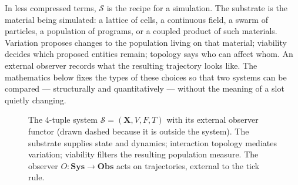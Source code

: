 \documentclass[journal]{IEEEtran}
\theoremstyle{plain}
\theoremstyle{definition}
\theoremstyle{plain}
\newcommand{\Mplus}{\mathcal{M}_{+}}
\newcommand{\X}{\mathbf{X}}
\begin{document}
In less compressed terms, $\mathcal{S}$ is the recipe for a simulation. The
substrate is the material being simulated: a lattice of cells, a continuous
field, a swarm of particles, a population of programs, or a coupled product of
such materials. Variation proposes changes to the population living on that
material; viability decides which proposed entities remain; topology says who
can affect whom. An external observer records what the resulting trajectory
looks like. The mathematics below fixes the types of these choices so that
two systems can be compared --- structurally and quantitatively --- without
the meaning of a slot quietly changing.

\begin{figure}[t]
\centering
{}
\caption{The 4-tuple system $\mathcal{S}=(\X,V,F,T)$ with its external
observer functor (drawn dashed because it is outside the system). The
substrate supplies state and dynamics; interaction topology mediates
variation; viability filters the resulting population measure. The
observer $O : \mathbf{Sys} \to \mathbf{Obs}$ acts on trajectories,
external to the tick rule.}
\label{fig:four-slot}
\end{figure}
\end{document}
